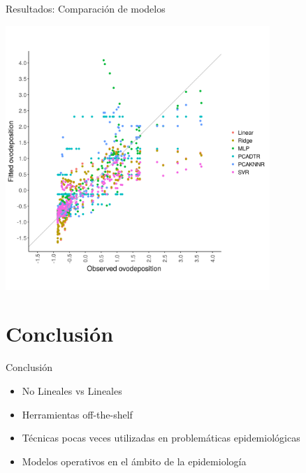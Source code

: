 \documentclass[10pt]{beamer}
\begin{document}
\begin{frame}{Resultados: Comparación de modelos}
  \begin{center}
  \includegraphics[width=0.75\textwidth]{scatterplot.png}
  \end{center}
\end{frame}

\section{Conclusión}

\begin{frame}{Conclusión}
  \begin{itemize}[<+->]
    \item No Lineales vs Lineales

    \item Herramientas off-the-shelf

    \item Técnicas pocas veces utilizadas en problemáticas epidemiológicas

    \item Modelos operativos en el ámbito de la epidemiología
  \end{itemize}
\end{frame}
\end{document}
